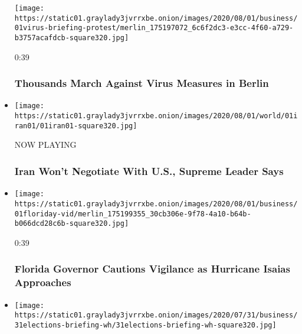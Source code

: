 \begin{itemize}
  \texttt{[image: https://static01.graylady3jvrrxbe.onion/images/2020/08/01/business/01virus-briefing-protest/merlin\_175197072\_6c6f2dc3-e3cc-4f60-a729-b3757acafdcb-square320.jpg]}

  0:39

  \hypertarget{thousands-march-against-virus-measures-in-berlin}{%
  \subsubsection{Thousands March Against Virus Measures in
  Berlin}\label{thousands-march-against-virus-measures-in-berlin}}
\item
  \texttt{[image: https://static01.graylady3jvrrxbe.onion/images/2020/08/01/world/01iran01/01iran01-square320.jpg]}

  NOW PLAYING

  \hypertarget{iran-wont-negotiate-with-us-supreme-leader-says-1}{%
  \subsubsection{Iran Won't Negotiate With U.S., Supreme Leader
  Says}\label{iran-wont-negotiate-with-us-supreme-leader-says-1}}
\item
  \href{https://www.nytimes3xbfgragh.onion/video/us/100000007268424/desantis-florida-hurricane-isaias.html?action=click\&module=video-series-bar\&region=header\&pgtype=Article\&playlistId=video/latest-video}{}

  \texttt{[image: https://static01.graylady3jvrrxbe.onion/images/2020/08/01/business/01floriday-vid/merlin\_175199355\_30cb306e-9f78-4a10-b64b-b066dcd28c6b-square320.jpg]}

  0:39

  \hypertarget{florida-governor-cautions-vigilance-as-hurricane-isaias-approaches}{%
  \subsubsection{Florida Governor Cautions Vigilance as Hurricane Isaias
  Approaches}\label{florida-governor-cautions-vigilance-as-hurricane-isaias-approaches}}
\item
  \href{https://www.nytimes3xbfgragh.onion/video/us/100000007267362/white-house-mail-in-ballots-election.html?action=click\&module=video-series-bar\&region=header\&pgtype=Article\&playlistId=video/latest-video}{}

  \texttt{[image: https://static01.graylady3jvrrxbe.onion/images/2020/07/31/business/31elections-briefing-wh/31elections-briefing-wh-square320.jpg]}


\end{itemize}
